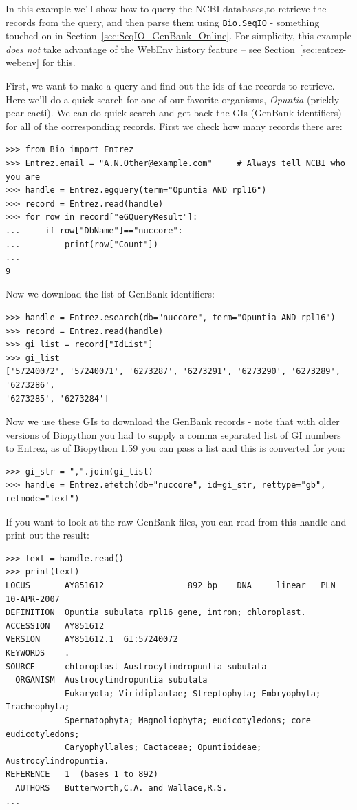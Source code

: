 \documentclass{report}
\begin{document}
In this example we'll show how to query the NCBI databases,to retrieve the records from the query, and then parse them using \verb+Bio.SeqIO+  - something touched on in Section~\ref{sec:SeqIO_GenBank_Online}.
For simplicity, this example \emph{does not} take advantage of the WebEnv history feature -- see Section~\ref{sec:entrez-webenv} for this.

First, we want to make a query and find out the ids of the records to retrieve. Here we'll do a quick search for one of our favorite organisms, \emph{Opuntia} (prickly-pear cacti). We can do quick search and get back the GIs (GenBank identifiers) for all of the corresponding records. First we check how many records there are:

\begin{verbatim}
>>> from Bio import Entrez
>>> Entrez.email = "A.N.Other@example.com"     # Always tell NCBI who you are
>>> handle = Entrez.egquery(term="Opuntia AND rpl16")
>>> record = Entrez.read(handle)
>>> for row in record["eGQueryResult"]:
...     if row["DbName"]=="nuccore":
...         print(row["Count"])
...
9
\end{verbatim}
Now we download the list of GenBank identifiers:
\begin{verbatim}
>>> handle = Entrez.esearch(db="nuccore", term="Opuntia AND rpl16")
>>> record = Entrez.read(handle)
>>> gi_list = record["IdList"]
>>> gi_list
['57240072', '57240071', '6273287', '6273291', '6273290', '6273289', '6273286',
'6273285', '6273284']
\end{verbatim}

Now we use these GIs to download the GenBank records - note that with older versions of Biopython you had to supply a comma separated list of GI numbers to Entrez, as of Biopython 1.59 you can pass a list and this is converted for you:

\begin{verbatim}
>>> gi_str = ",".join(gi_list)
>>> handle = Entrez.efetch(db="nuccore", id=gi_str, rettype="gb", retmode="text")
\end{verbatim}

If you want to look at the raw GenBank files, you can read from this handle and print out the result:

\begin{verbatim}
>>> text = handle.read()
>>> print(text)
LOCUS       AY851612                 892 bp    DNA     linear   PLN 10-APR-2007
DEFINITION  Opuntia subulata rpl16 gene, intron; chloroplast.
ACCESSION   AY851612
VERSION     AY851612.1  GI:57240072
KEYWORDS    .
SOURCE      chloroplast Austrocylindropuntia subulata
  ORGANISM  Austrocylindropuntia subulata
            Eukaryota; Viridiplantae; Streptophyta; Embryophyta; Tracheophyta;
            Spermatophyta; Magnoliophyta; eudicotyledons; core eudicotyledons;
            Caryophyllales; Cactaceae; Opuntioideae; Austrocylindropuntia.
REFERENCE   1  (bases 1 to 892)
  AUTHORS   Butterworth,C.A. and Wallace,R.S.
...
\end{verbatim}
\end{document}
